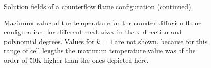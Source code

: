 \begin{figure}[t]
	\ContinuedFloat
	\centering
	\pgfplotsset{width=0.81\textwidth, compat=1.3}
	\caption[]{Solution fields of a counterflow flame configuration (continued).}%
\end{figure}


\begin{figure}[tbp]
	\centering
	\caption{Maximum value of the temperature for the counter diffusion flame configuration, for different mesh sizes in the x-direction and polynomial degrees. Values for $k=1$ are not shown, because for this range of cell lengths the maximum temperature value was of the order of 50K higher than the ones depicted here.}
	\label{fig:TemperatureConvergenceDiffFlame}
\end{figure}
\FloatBarrier
\newpage
